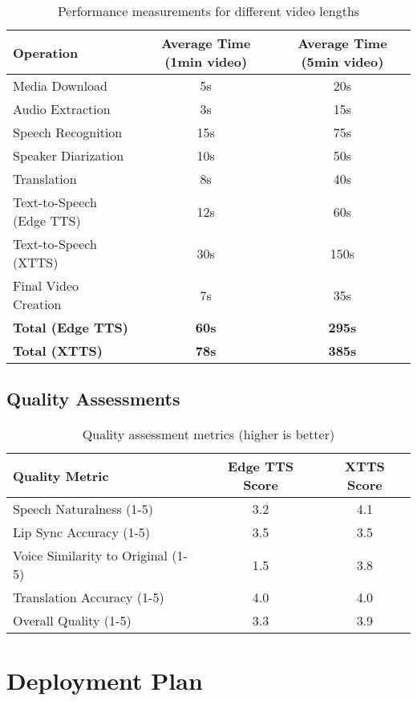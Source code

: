\documentclass[11pt,a4paper]{article}
\begin{document}
\begin{table}[h]
\centering
\begin{tabular}{lcc}
\toprule
\textbf{Operation} & \textbf{Average Time (1min video)} & \textbf{Average Time (5min video)} \\
\midrule
Media Download & 5s & 20s \\
Audio Extraction & 3s & 15s \\
Speech Recognition & 15s & 75s \\
Speaker Diarization & 10s & 50s \\
Translation & 8s & 40s \\
Text-to-Speech (Edge TTS) & 12s & 60s \\
Text-to-Speech (XTTS) & 30s & 150s \\
Final Video Creation & 7s & 35s \\
\midrule
\textbf{Total (Edge TTS)} & \textbf{60s} & \textbf{295s} \\
\textbf{Total (XTTS)} & \textbf{78s} & \textbf{385s} \\
\bottomrule
\end{tabular}
\caption{Performance measurements for different video lengths}
\end{table}

\subsection{Quality Assessments}

\begin{table}[h]
\centering
\begin{tabular}{lcc}
\toprule
\textbf{Quality Metric} & \textbf{Edge TTS Score} & \textbf{XTTS Score} \\
\midrule
Speech Naturalness (1-5) & 3.2 & 4.1 \\
Lip Sync Accuracy (1-5) & 3.5 & 3.5 \\
Voice Similarity to Original (1-5) & 1.5 & 3.8 \\
Translation Accuracy (1-5) & 4.0 & 4.0 \\
Overall Quality (1-5) & 3.3 & 3.9 \\
\bottomrule
\end{tabular}
\caption{Quality assessment metrics (higher is better)}
\end{table}

\section{Deployment Plan}
\end{document}

